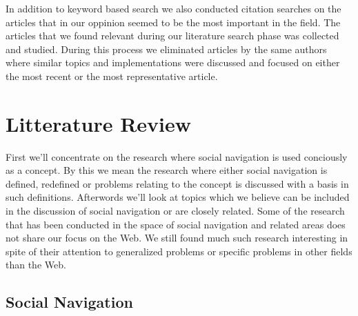 
In addition to keyword based search we also conducted citation searches on the
articles that in our oppinion seemed to be the most important in the field.
The articles that we found relevant during our literature search phase was
collected and studied. During this process we eliminated articles by the same
authors where similar topics and implementations were discussed and focused on
either the most recent or the most representative article.

\section{Litterature Review}

First we'll concentrate on the research where social navigation is used
conciously as a concept. By this we mean the research where either social
navigation is defined, redefined or problems relating to the concept is
discussed with a basis in such definitions. Afterwords we'll look at topics
which we believe can be included in the discussion of social navigation or are
closely related. Some of the research that has been conducted in the space of
social navigation and related areas does not share our focus on the Web.
We still found much such research interesting in spite of their attention to
generalized problems or specific problems in other fields than the Web.

\subsection{Social Navigation}
\label{section:background.social.navigation}

